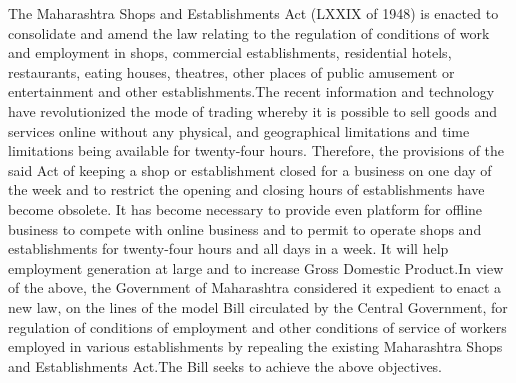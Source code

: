\documentclass[gaz8,ordinance]{mhact}
\begin{document}
\begin{sor}
          \item{}
          The Maharashtra Shops and Establishments Act (LXXIX of 1948) is 
enacted to consolidate and amend the law relating to the regulation of 
conditions of work and employment in shops, commercial establishments, 
residential hotels, restaurants, eating houses, theatres, other places of public 
amusement or entertainment and other establishments.The recent information and technology have revolutionized the mode 
of trading whereby it is possible to sell goods and services online without 
any physical, and geographical limitations and time limitations being available 
for twenty-four hours. Therefore, the provisions of the said Act of keeping a 
shop or establishment closed for a business on one day of the week and to 
restrict the opening and closing hours of establishments have become obsolete. 
It has become necessary to provide even platform for offline business to 
compete with online business and to permit to operate shops and 
establishments for twenty-four hours and all days in a week. It will help 
employment generation at large and to increase Gross Domestic Product.In view of the above, the Government of Maharashtra considered it 
expedient to enact a new law, on the lines of the model Bill circulated by the 
Central Government, for regulation of conditions of employment and other 
conditions of service of workers employed in various establishments by 
repealing the existing Maharashtra Shops and Establishments Act.The Bill seeks to achieve the above objectives.

\end{sor}
\end{document}
